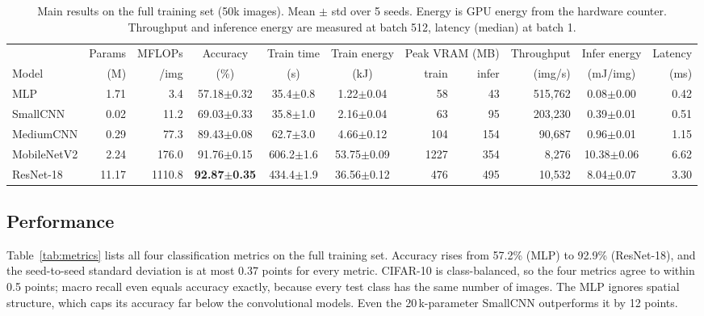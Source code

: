 \documentclass[conference]{IEEEtran}
\begin{document}
\begin{table}[t]
\centering
\caption{Main results on the full training set (50k images). Mean $\pm$ std over 5 seeds. Energy is GPU energy from the hardware counter. Throughput and inference energy are measured at batch 512, latency (median) at batch 1.}
\label{tab:main}
\setlength{\tabcolsep}{3.5pt}
\begin{tabular}{lrrcccrrrcr}
\toprule
 & Params & MFLOPs & Accuracy & Train time & Train energy & \multicolumn{2}{c}{Peak VRAM (MB)} & Throughput & Infer energy & Latency \\
Model & (M) & /img & (\%) & (s) & (kJ) & train & infer & (img/s) & (mJ/img) & (ms) \\
\midrule
MLP         & 1.71  & 3.4    & 57.18$\pm$0.32 & 35.4$\pm$0.8  & 1.22$\pm$0.04  & 58   & 43  & 515{,}762 & 0.08$\pm$0.00  & 0.42 \\
SmallCNN    & 0.02  & 11.2   & 69.03$\pm$0.33 & 35.8$\pm$1.0  & 2.16$\pm$0.04  & 63   & 95  & 203{,}230 & 0.39$\pm$0.01  & 0.51 \\
MediumCNN   & 0.29  & 77.3   & 89.43$\pm$0.08 & 62.7$\pm$3.0  & 4.66$\pm$0.12  & 104  & 154 & 90{,}687  & 0.96$\pm$0.01  & 1.15 \\
MobileNetV2 & 2.24  & 176.0  & 91.76$\pm$0.15 & 606.2$\pm$1.6 & 53.75$\pm$0.09 & 1227 & 354 & 8{,}276   & 10.38$\pm$0.06 & 6.62 \\
ResNet-18   & 11.17 & 1110.8 & \textbf{92.87$\pm$0.35} & 434.4$\pm$1.9 & 36.56$\pm$0.12 & 476  & 495 & 10{,}532  & 8.04$\pm$0.07  & 3.30 \\
\bottomrule
\end{tabular}
\end{table}

\subsection{Performance}
Table~\ref{tab:metrics} lists all four classification metrics on the full training set. Accuracy rises from 57.2\% (MLP) to 92.9\% (ResNet-18), and the seed-to-seed standard deviation is at most 0.37 points for every metric. CIFAR-10 is class-balanced, so the four metrics agree to within 0.5 points; macro recall even equals accuracy exactly, because every test class has the same number of images. The MLP ignores spatial structure, which caps its accuracy far below the convolutional models. Even the 20\,k-parameter SmallCNN outperforms it by 12 points.
\end{document}
